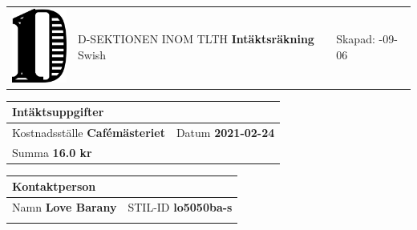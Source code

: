 \documentclass{article}
\newcommand{\skapad}{2021-09-06}
\newcommand{\kostnadsstalle}{Cafémästeriet}
\newcommand{\typ}{Swish}
\newcommand{\datum}{2021-02-24}
\newcommand{\summa}{16.0 kr}
\newcommand{\namn}{Love Barany}
\newcommand{\stilid}{lo5050ba-s}
\begin{document}
    \hspace{-0.3in}
    \begin{tabular}{p{1.0in}p{3.5in}p{2in}}
    \includegraphics[width=0.8in]{D-symbol.pdf} &
    \vspace{-1in}
    {\large \uppercase{D-sektionen inom TLTH}} \newline \newline
    {\Huge \textsf{\textbf{Intäktsräkning}}}
    \newline \newline
    {\large \typ}&
    \vspace{-1in}
    Skapad: \newline
    \skapad \newline
    \end{tabular}

    \vspace{0.5in}
    \hspace{-0.3in}
    \begin{tabular}{|p{1.4in}|p{0.9in}|}
        \multicolumn{2}{l}{Intäktsuppgifter} \\
        \hline
        {\footnotesize Kostnadsställe} \newline \textbf{\kostnadsstalle}&
        {\footnotesize Datum} \newline \textbf{\datum} \\
        \hline
        \multicolumn{2}{|p{2.3in}|}{{\footnotesize Summa} \newline \textbf{\summa}} \\
        \hline
    \end{tabular}
    \hspace{0.1in}
    \begin{tabular}{|p{1.3in}|p{0.9in}|p{1.1in}|}
        \multicolumn{3}{l}{Kontaktperson} \\
        \hline
        \multicolumn{2}{|p{2.2in}|}{{\footnotesize Namn} \newline \textbf{\namn}}
          &
         {\footnotesize STIL-ID} \newline \textbf{\stilid} \\
         \hline
         \multicolumn{3}{p{3.3in}}{{\footnotesize \quad} \newline \textbf{\quad}}
    \end{tabular}
\end{document}
